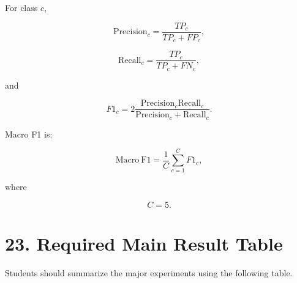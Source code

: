 \documentclass[10pt]{article}
\begin{document}
For class $c$,

\[
\mathrm{Precision}_c
=
\frac{TP_c}
{TP_c+FP_c},
\]

\[
\mathrm{Recall}_c
=
\frac{TP_c}
{TP_c+FN_c},
\]

and

\[
F1_c
=
2
\frac{
\mathrm{Precision}_c
\mathrm{Recall}_c
}{
\mathrm{Precision}_c+
\mathrm{Recall}_c
}.
\]

Macro F1 is:

\[
\mathrm{Macro\ F1}
=
\frac{1}{C}
\sum_{c=1}^{C}
F1_c,
\]

where

\[
C=5.
\]

\section*{23. Required Main Result Table}

Students should summarize the major experiments using the following table.
\end{document}
